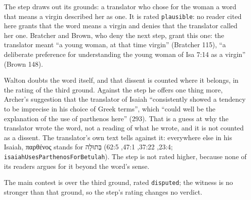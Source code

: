 \documentclass[11pt]{article}
\begin{document}
The step draws out its grounds: a translator who chose for the woman a word that means a virgin described her as one. It is rated \texttt{plausible}: no reader cited here grants that the word means a virgin and denies that the translator called her one. Bratcher and Brown, who deny the next step, grant this one: the translator meant “a young woman, at that time virgin” (Bratcher 115), “a deliberate preference for understanding the young woman of Isa 7:14 as a virgin” (Brown 148).

Walton doubts the word itself, and that dissent is counted where it belongs, in the rating of the third ground. Against the step he offers one thing more, Archer’s suggestion that the translator of Isaiah “consistently showed a tendency to be imprecise in his choice of Greek terms”, which “could well be the explanation of the use of parthenos here” (293). That is a guess at why the translator wrote the word, not a reading of what he wrote, and it is not counted as a dissent. The translator’s own text tells against it: everywhere else in his Isaiah, παρθένος stands for בְּתוּלָה (23:4, 37:22, 47:1, 62:5; \texttt{isaiah\allowbreak{}Uses\allowbreak{}Parthenos\allowbreak{}For\allowbreak{}Betulah}). The step is not rated higher, because none of its readers argues for it beyond the word’s sense.

The main contest is over the third ground, rated \texttt{disputed}; the witness is no stronger than that ground, so the step’s rating changes no verdict.
\end{document}

